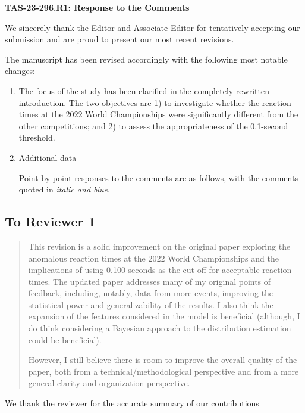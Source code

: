 \documentclass[12pt]{article}
\newenvironment{comment}%
{\begin{quotation}\noindent\small\it\color{darkblue}\ignorespaces%
}{\end{quotation}}
\begin{document}
\begin{center}
  {\Large\bf TAS-23-296.R1: Response to the Comments}
\end{center}

We sincerely thank the Editor and Associate Editor for tentatively accepting our
submission and are proud to present our most recent revisions.


The manuscript has been revised accordingly with the following most
notable changes:
\begin{enumerate}
\item
  The focus of the study has been clarified in the completely
  rewritten introduction. The two objectives are 1) to investigate
  whether the reaction times at the 2022 World Championships were
  significantly different from the other competitions; and 2) to
  assess the appropriateness of the 0.1-second threshold.
\item
  Additional data

Point-by-point responses to the comments are as follows, with the
comments quoted in \emph{\color{darkblue} italic and blue}.
\end{enumerate}


\subsection*{To Reviewer 1}

\begin{comment}
This revision is a solid improvement on the original paper exploring the
anomalous reaction times at the 2022 World Championships and the implications of
using 0.100 seconds as the cut off for acceptable reaction times. The updated
paper addresses many of my original points of feedback, including, notably, data
from more events, improving the statistical power and generalizability of the
results. I also think the expansion of the features considered in the model is
beneficial (although, I do think considering a Bayesian approach to the
distribution estimation could be beneficial).

However, I still believe there is room to improve the overall quality of the
paper, both from a technical/methodological perspective and from a more general
clarity and organization perspective.


\end{comment}

We thank the reviewer for the accurate summary of our contributions
\end{document}
